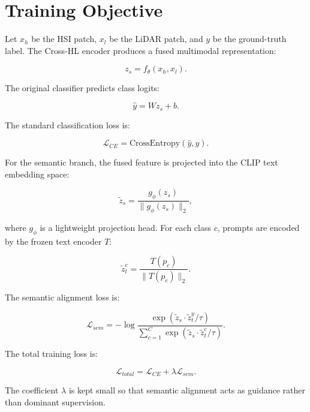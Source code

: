 \documentclass[10pt,journal,compsoc]{IEEEtran}
\begin{document}
\section{Training Objective}

Let $x_h$ be the HSI patch, $x_l$ be the LiDAR patch, and $y$ be the ground-truth label. The Cross-HL encoder produces a fused multimodal representation:

\begin{equation}
z_s = f_{\theta}(x_h, x_l).
\end{equation}

The original classifier predicts class logits:

\begin{equation}
\hat{y} = W z_s + b.
\end{equation}

The standard classification loss is:

\begin{equation}
\mathcal{L}_{CE} = \mathrm{CrossEntropy}(\hat{y}, y).
\end{equation}

For the semantic branch, the fused feature is projected into the CLIP text embedding space:

\begin{equation}
\tilde{z}_s = \frac{g_{\phi}(z_s)}{\|g_{\phi}(z_s)\|_2},
\end{equation}

where $g_{\phi}$ is a lightweight projection head. For each class $c$, prompts are encoded by the frozen text encoder $T$:

\begin{equation}
\tilde{z}_t^c = \frac{T(p_c)}{\|T(p_c)\|_2}.
\end{equation}

The semantic alignment loss is:

\begin{equation}
\mathcal{L}_{sem} =
- \log
\frac{\exp(\tilde{z}_s \cdot \tilde{z}_t^y / \tau)}
{\sum_{c=1}^{C}\exp(\tilde{z}_s \cdot \tilde{z}_t^c / \tau)}.
\end{equation}

The total training loss is:

\begin{equation}
\mathcal{L}_{total}=\mathcal{L}_{CE}+\lambda\mathcal{L}_{sem}.
\end{equation}

The coefficient $\lambda$ is kept small so that semantic alignment acts as guidance rather than dominant supervision.
\end{document}
